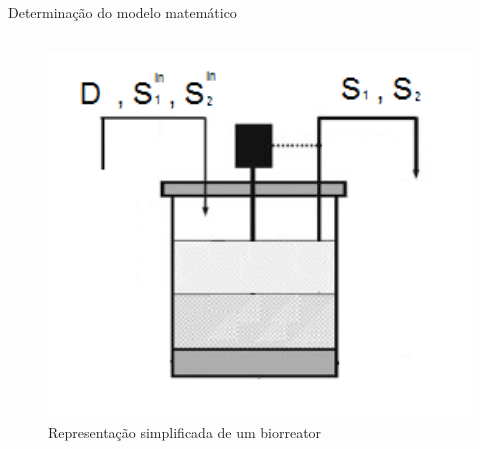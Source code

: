\documentclass[10pt]{beamer}
\begin{document}
\begin{frame}[fragile]{Determinação do modelo matemático}
\begin{columns}
\begin{column}{0.35\textwidth} 
    \begin{center}
    \begin{figure}
    \includegraphics[width=1\textwidth]{figures/esquema_biorreator.png}
     \caption{Representação simplificada de um biorreator}
    \end{figure}
     \end{center}
\end{column}
\end{columns}

\end{frame}
\end{document}
